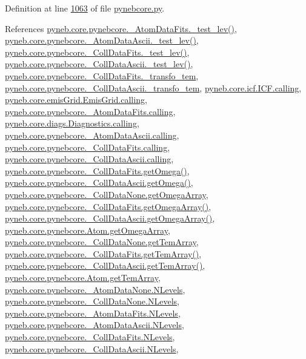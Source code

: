Definition at line \hyperlink{pynebcore_8py_source_l01063}{1063} of file \hyperlink{pynebcore_8py_source}{pynebcore.\+py}.



References \hyperlink{pynebcore_8py_source_l00171}{pyneb.\+core.\+pynebcore.\+\_\+\+Atom\+Data\+Fits.\+\_\+test\+\_\+lev()}, \hyperlink{pynebcore_8py_source_l00435}{pyneb.\+core.\+pynebcore.\+\_\+\+Atom\+Data\+Ascii.\+\_\+test\+\_\+lev()}, \hyperlink{pynebcore_8py_source_l00660}{pyneb.\+core.\+pynebcore.\+\_\+\+Coll\+Data\+Fits.\+\_\+test\+\_\+lev()}, \hyperlink{pynebcore_8py_source_l01026}{pyneb.\+core.\+pynebcore.\+\_\+\+Coll\+Data\+Ascii.\+\_\+test\+\_\+lev()}, \hyperlink{pynebcore_8py_source_l00589}{pyneb.\+core.\+pynebcore.\+\_\+\+Coll\+Data\+Fits.\+\_\+transfo\+\_\+tem}, \hyperlink{pynebcore_8py_source_l00945}{pyneb.\+core.\+pynebcore.\+\_\+\+Coll\+Data\+Ascii.\+\_\+transfo\+\_\+tem}, \hyperlink{icf_8py_source_l00016}{pyneb.\+core.\+icf.\+I\+C\+F.\+calling}, \hyperlink{emis_grid_8py_source_l00041}{pyneb.\+core.\+emis\+Grid.\+Emis\+Grid.\+calling}, \hyperlink{pynebcore_8py_source_l00090}{pyneb.\+core.\+pynebcore.\+\_\+\+Atom\+Data\+Fits.\+calling}, \hyperlink{diags_8py_source_l00169}{pyneb.\+core.\+diags.\+Diagnostics.\+calling}, \hyperlink{pynebcore_8py_source_l00311}{pyneb.\+core.\+pynebcore.\+\_\+\+Atom\+Data\+Ascii.\+calling}, \hyperlink{pynebcore_8py_source_l00568}{pyneb.\+core.\+pynebcore.\+\_\+\+Coll\+Data\+Fits.\+calling}, \hyperlink{pynebcore_8py_source_l00918}{pyneb.\+core.\+pynebcore.\+\_\+\+Coll\+Data\+Ascii.\+calling}, \hyperlink{pynebcore_8py_source_l00811}{pyneb.\+core.\+pynebcore.\+\_\+\+Coll\+Data\+Fits.\+get\+Omega()}, \hyperlink{pynebcore_8py_source_l01063}{pyneb.\+core.\+pynebcore.\+\_\+\+Coll\+Data\+Ascii.\+get\+Omega()}, \hyperlink{pynebcore_8py_source_l00067}{pyneb.\+core.\+pynebcore.\+\_\+\+Coll\+Data\+None.\+get\+Omega\+Array}, \hyperlink{pynebcore_8py_source_l00783}{pyneb.\+core.\+pynebcore.\+\_\+\+Coll\+Data\+Fits.\+get\+Omega\+Array()}, \hyperlink{pynebcore_8py_source_l01039}{pyneb.\+core.\+pynebcore.\+\_\+\+Coll\+Data\+Ascii.\+get\+Omega\+Array()}, \hyperlink{pynebcore_8py_source_l01247}{pyneb.\+core.\+pynebcore.\+Atom.\+get\+Omega\+Array}, \hyperlink{pynebcore_8py_source_l00068}{pyneb.\+core.\+pynebcore.\+\_\+\+Coll\+Data\+None.\+get\+Tem\+Array}, \hyperlink{pynebcore_8py_source_l00880}{pyneb.\+core.\+pynebcore.\+\_\+\+Coll\+Data\+Fits.\+get\+Tem\+Array()}, \hyperlink{pynebcore_8py_source_l01110}{pyneb.\+core.\+pynebcore.\+\_\+\+Coll\+Data\+Ascii.\+get\+Tem\+Array()}, \hyperlink{pynebcore_8py_source_l01248}{pyneb.\+core.\+pynebcore.\+Atom.\+get\+Tem\+Array}, \hyperlink{pynebcore_8py_source_l00062}{pyneb.\+core.\+pynebcore.\+\_\+\+Atom\+Data\+None.\+N\+Levels}, \hyperlink{pynebcore_8py_source_l00075}{pyneb.\+core.\+pynebcore.\+\_\+\+Coll\+Data\+None.\+N\+Levels}, \hyperlink{pynebcore_8py_source_l00155}{pyneb.\+core.\+pynebcore.\+\_\+\+Atom\+Data\+Fits.\+N\+Levels}, \hyperlink{pynebcore_8py_source_l00404}{pyneb.\+core.\+pynebcore.\+\_\+\+Atom\+Data\+Ascii.\+N\+Levels}, \hyperlink{pynebcore_8py_source_l00637}{pyneb.\+core.\+pynebcore.\+\_\+\+Coll\+Data\+Fits.\+N\+Levels}, \hyperlink{pynebcore_8py_source_l00984}{pyneb.\+core.\+pynebcore.\+\_\+\+Coll\+Data\+Ascii.\+N\+Levels}, 
